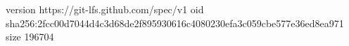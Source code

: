 version https://git-lfs.github.com/spec/v1
oid sha256:2fcc00d7044d4c3d68de2f895930616c4080230efa3c059cbe577e36ed8ea971
size 196704
